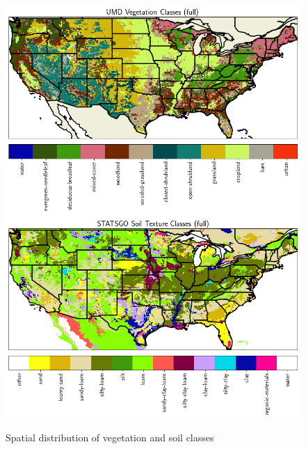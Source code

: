 \begin{figure}[hp!]
    \centering
    \includegraphics[width=.85\linewidth,draft=false]{figures/static_umd-veg-classes_full.png}
    \includegraphics[width=.85\linewidth,draft=false]{figures/static_statsgo-soil-classes_full.png}
    \caption{Spatial distribution of vegetation and soil classes}
    \label{static-classes}
\end{figure}

